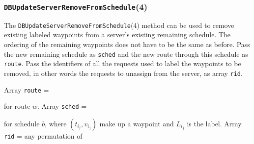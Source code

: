\documentclass{article}
\theoremstyle{definition}                   %
\begin{document}
\subsubsection{{\tt{}\protect{}DBUpdateServerRemoveFromSchedule}(4)}
The {\tt{}\protect{}DBUpdateServerRemoveFromSchedule}(4) method can be used to remove
existing labeled waypoints from a server's existing remaining schedule. The
ordering of the remaining waypoints does not have to be the same as before.
Pass the new remaining schedule as {\tt{}sched} and the new route through this
schedule as {\tt{}route}. Pass the identifiers of all the requests used to label
the waypoints to be removed, in other words the requests to unassign from the
server, as array {\tt{}rid}.

Array {\tt{}route} =

\noindent
{}

\noindent for route $w$. Array {\tt{}sched} =

\noindent
{}

\noindent for schedule $b$, where $(t_{i_j},v_{i_j})$ make up a waypoint and
$L_{i_j}$ is the label. Array {\tt{}rid} = any permutation of

\noindent
{}
\end{document}
